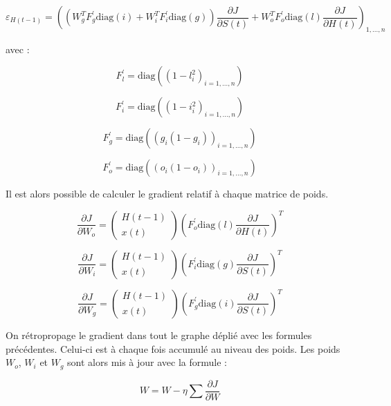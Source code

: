 \begin{equation}
\varepsilon_{H(t-1)} = \left((W_{g}^{T}F_{g}^{\prime}\text{diag}(i) + W_{i}^{T}F_{i}^{\prime}\text{diag}(g))\frac{\partial J}{\partial S(t)} + W_{o}^{T}F_{o}^{\prime}\text{diag}(l)\frac{\partial J}{\partial H(t)}\right)_{1,...,n}
\end{equation}

avec :

\[
F_{l}^{\prime} = \text{diag}((1 - l_{i}^{2})_{i=1,...,n})
\]

\[
F_{i}^{\prime} = \text{diag}((1 - i_{i}^{2})_{i=1,...,n})
\]

\[
F_{g}^{\prime} = \text{diag}((g_{i}(1 - g_{i}))_{i=1,...,n})
\]

\[
F_{o}^{\prime} = \text{diag}((o_{i}(1 - o_{i}))_{i=1,...,n})
\]


Il est alors possible de calculer le gradient relatif à chaque matrice de poids.

\begin{equation}
\frac{\partial J}{\partial W_{o}}=
\begin{pmatrix}
H(t-1) \\
x(t)
\end{pmatrix}
\left(F_{o}^{\prime}\text{diag}(l)\frac{\partial J}{\partial H(t)}\right)^{T}
\end{equation}

\begin{equation}
\frac{\partial J}{\partial W_{i}}=
\begin{pmatrix}
H(t-1) \\
x(t)
\end{pmatrix}
\left(F_{i}^{\prime}\text{diag}(g)\frac{\partial J}{\partial S(t)}\right)^{T}
\end{equation}

\begin{equation}
\frac{\partial J}{\partial W_{g}}=
\begin{pmatrix}
H(t-1) \\
x(t)
\end{pmatrix}
\left(F_{g}^{\prime}\text{diag}(i)\frac{\partial J}{\partial S(t)}\right)^{T}
\end{equation}

On rétropropage le gradient dans tout le graphe déplié avec les formules précédentes. Celui-ci est à chaque fois accumulé au niveau des poids. Les poids $W_{o}$, $W_{i}$ et $W_{g}$ sont alors mis à jour avec la formule :

\begin{equation}
W = W - \eta \sum{\frac{\partial J}{\partial W}}
\end{equation} 

